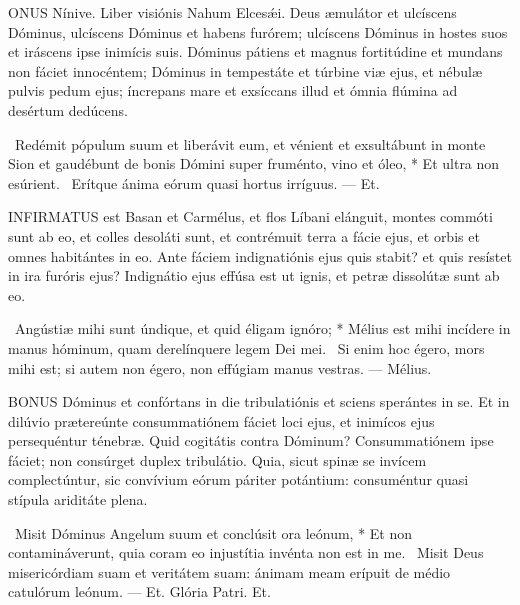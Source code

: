 
\lettrine[lines=2]{O}{NUS} Nínive. Liber visiónis Nahum Elcesǽi. Deus æmulátor et ulcíscens Dóminus, ulcíscens Dóminus et habens furórem; ulcíscens Dóminus in hostes suos et iráscens ipse inimícis suis. Dóminus pátiens et magnus fortitúdine et mundans non fáciet innocéntem; Dóminus in tempestáte et túrbine viæ ejus, et nébulæ pulvis pedum ejus; íncrepans mare et exsíccans illud et ómnia flúmina ad desértum dedúcens.

\R\ Redémit pópulum suum et liberávit eum, et vénient et exsultábunt in monte Sion et gaudébunt de bonis Dómini super fruménto, vino et óleo, * Et ultra non esúrient. \V\ Erítque ánima eórum quasi hortus irríguus. — Et.


\lettrine[lines=2]{I}{NFIRMATUS} est Basan et Carmélus, et flos Líbani elánguit, montes commóti sunt ab eo, et colles desoláti sunt, et contrémuit terra a fácie ejus, et orbis et omnes habitántes in eo. Ante fáciem indignatiónis ejus quis stabit? et quis resístet in ira furóris ejus? Indignátio ejus effúsa est ut ignis, et petræ dissolútæ sunt ab eo.

\R\ Angústiæ mihi sunt úndique, et quid éligam ignóro; * Mélius est mihi incídere in manus hóminum, quam derelínquere legem Dei mei. \V\ Si enim hoc égero, mors mihi est; si autem non égero, non effúgiam manus vestras. — Mélius.



\lettrine[lines=2]{B}{ONUS} Dóminus et confórtans in die tribulatiónis et sciens sperántes in se. Et in dilúvio prætereúnte consummatiónem fáciet loci ejus, et inimícos ejus persequéntur ténebræ. Quid cogitátis contra Dóminum? Consummatiónem ipse fáciet; non consúrget duplex tribulátio. Quia, sicut spinæ se invícem complectúntur, sic convívium eórum páriter potántium: consuméntur quasi stípula ariditáte plena.

\R\ Misit Dóminus Angelum suum et conclúsit ora leónum, * Et non contamináverunt, quia coram eo injustítia invénta non est in me. \V\ Misit Deus misericórdiam suam et veritátem suam: ánimam meam erípuit de médio catulórum leónum. — Et. Glória Patri. Et.



